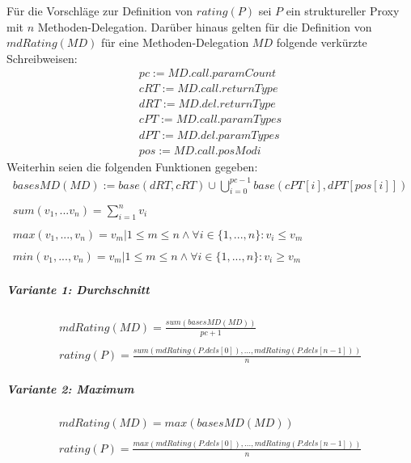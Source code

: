 \documentclass[a4paper,12pt]{article}
\begin{document}
Für die Vorschläge zur Definition von $\mathit{rating(P)}$ sei $P$ ein struktureller Proxy mit $n$ Methoden-Delegation.
Darüber hinaus gelten für die Definition von $\mathit{mdRating(MD)}$ für eine Methoden-Delegation $\mathit{MD}$ folgende verkürzte Schreibweisen:
\begin{gather*}
	\mathit{pc} := \mathit{MD.call.paramCount}
	\\
	\mathit{cRT} := \mathit{MD.call.returnType}
	\\
	\mathit{dRT} := \mathit{MD.del.returnType}
	\\
	\mathit{cPT} := \mathit{MD.call.paramTypes}
	\\
	\mathit{dPT} := \mathit{MD.del.paramTypes}
	\\
	\mathit{pos} := \mathit{MD.call.posModi}
\end{gather*}
Weiterhin seien die folgenden Funktionen gegeben:
\begin{gather*}
\mathit{basesMD(MD)} :=  \mathit{base(dRT, cRT)} \cup \bigcup\limits_{i=0}^{pc-1} \mathit{base(cPT[i],dPT[pos[i]])}
				\\\\
				\mathit{sum(v_1,...v_n)} = \sum_{i=1}^{n}v_i
\\\\         
\mathit{max(v_1,...,v_n)} = v_{m}| 1 \leq m \leq n  \wedge \forall i \in  \{1,...,n\}: v_i \leq v_{m}
\\\\       
\mathit{min(v_1,...,v_n)} = v_{m}| 1 \leq m \leq n  \wedge \forall i \in  \{1,...,n\}: v_i \geq v_{m}   
\end{gather*}



\subparagraph{Variante 1: Durchschnitt}

\begin{gather*}
\mathit{mdRating(MD)} = \frac{\mathit{sum(basesMD(MD))}}{\mathit{pc} + 1}
\\\\
\mathit{rating(P)} = \frac{ \mathit{sum(mdRating(P.dels[0]),...,mdRating(P.dels[n-1]))}}{n}
\end{gather*}



\subparagraph{Variante 2: Maximum}

\begin{gather*}
\mathit{mdRating(MD)} = \mathit{max(basesMD(MD))}
\\\\
\mathit{rating(P)} = \frac{\mathit{max(mdRating(P.dels[0]),...,mdRating(P.dels[n-1]))}}{n}
\end{gather*}
\end{document}
